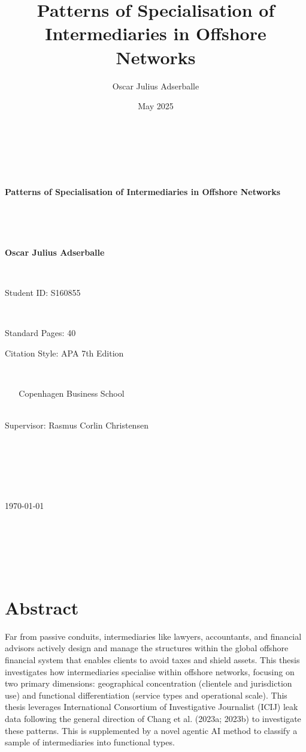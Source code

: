 \documentclass[12pt, a4paper]{report}
\title{Patterns of Specialisation of Intermediaries in Offshore Networks}
\author{Oscar Julius Adserballe}
\date{May 2025}
\begin{document}
\begin{titlepage}
    \centering
    \vspace*{1cm} 

    {\Huge\bfseries Patterns of Specialisation of Intermediaries in Offshore Networks\par}

    \vspace{1.5cm}

    {\Large\bfseries Oscar Julius Adserballe\par} 
    {\large Student ID: S160855\par} 

    \vspace{1cm}

    {\large Standard Pages: 40\par} 
    {\large Citation Style: APA 7th Edition\par} 

    \vspace{1cm}

    {\large Copenhagen Business School} \\ %
    {\large Supervisor: Rasmus Corlin Christensen\par} 

    \vspace{1cm}

    {\large \today\par} 

    \vfill 
\end{titlepage}

\pagestyle{plain} %

\newpage
\tableofcontents %

\newpage
\listoffigures %

\newpage
\listoftables  %

\newpage

\chapter*{Abstract}
\label{sec:abstract}
Far from passive conduits, intermediaries like lawyers, accountants, and financial advisors actively design and manage the structures within the global offshore financial system that enables clients to avoid taxes and shield assets. This thesis investigates how intermediaries specialise within offshore networks, focusing on two primary dimensions: geographical concentration (clientele and jurisdiction use) and functional differentiation (service types and operational scale). This thesis leverages International Consortium of Investigative Journalist (ICIJ) leak data following the general direction of Chang et al. (2023a; 2023b) to investigate these patterns. This is supplemented by a novel agentic AI method to classify a sample of intermediaries into functional types.
\end{document}
